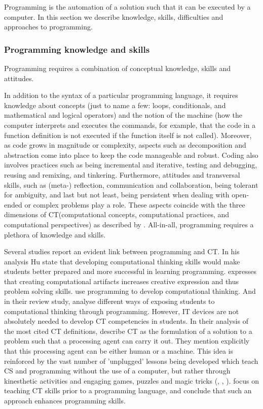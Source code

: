 Programming is the automation of a solution such that it can be executed by a computer. In this section we describe knowledge, skills, difficulties and approaches to programming.

\subsubsection{Programming knowledge and skills}\label{ProgrammingKnowledgeAndSkills}
Programming requires a combination of conceptual knowledge, skills and attitudes.

In addition to the syntax of a particular programming language, it requires knowledge about concepts (just to name a few: loops, conditionals, and mathematical and logical operators) and the notion of the machine (how the computer interprets and executes the commands, for example, that the code in a function definition is not executed if the function itself is not called). Moreover, as code grows in magnitude or complexity, aspects such as decomposition and abstraction come into place to keep the code manageable and robust. Coding also involves practices such as being incremental and iterative, testing and debugging, reusing and remixing, and tinkering. Furthermore, attitudes and transversal skills, such as (meta-) reflection, communication and collaboration, being tolerant for ambiguity, and last but not least, being persistent when dealing with open-ended or complex problems play a role. These aspects coincide with the three dimensions of CT(computational concepts, computational practices, and computational perspectives) as described by . All-in-all, programming requires a plethora of knowledge and skills.



Several studies report an evident link between programming and CT. In his analysis Hu \cite{hu2011computational} state that developing computational thinking skills would make students better prepared and more successful in learning programming.  expresses that creating computational artifacts increases creative expression and thus problem solving skills.  use programming to develop computational thinking. And in their review study,  analyse different ways of exposing students to computational thinking through programming. However, IT devices are not absolutely needed to develop CT competencies in students\cite{corradini2017conceptions}. In their analysis of the most cited CT definitions, \cite{corradini2017conceptions} describe CT as the formulation of a solution to a problem such that a processing agent can carry it out. They mention explicitly that this processing agent can be either human or a machine. This idea is reinforced by the vast number of 'unplugged' lessons being developed which teach CS and programming without the use of a computer, but rather through kinesthetic activities and engaging games, puzzles and magic tricks (\cite{curzon2009CT}, \cite{CSUnplugged}, \cite{CSFieldGuide}).  focus on teaching CT skills prior to a programming language, and conclude that such an approach enhances programming skills.


